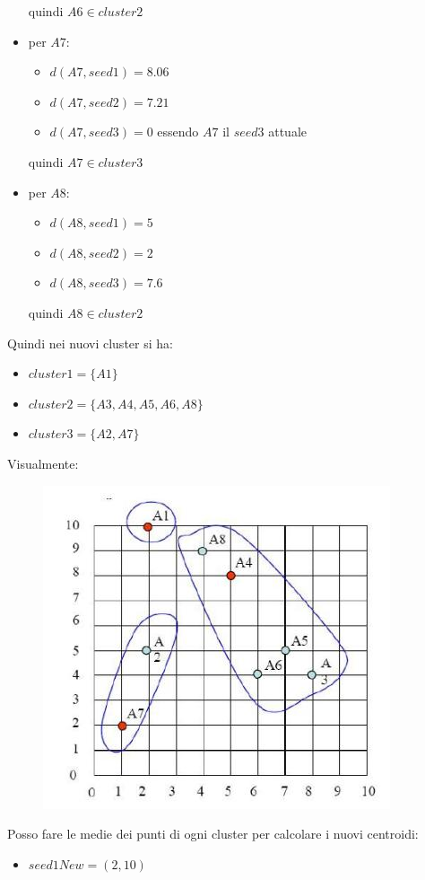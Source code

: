 \begin{esempio}
\begin{itemize}
    quindi $A6\in cluster2$
    \item per $A7$:
    \begin{itemize}
      \item $d(A7, seed1)=8.06$ 
      \item $d(A7, seed2)=7.21$ 
      \item $d(A7, seed3)=0$ essendo $A7$ il $seed3$ attuale
    \end{itemize}
    quindi $A7\in cluster3$
    \item per $A8$:
    \begin{itemize}
      \item $d(A8, seed1)=5$ 
      \item $d(A8, seed2)=2$
      \item $d(A8, seed3)=7.6$
    \end{itemize}
    quindi $A8\in cluster2$
  \end{itemize}
  Quindi nei nuovi cluster si ha:
  \begin{itemize}
    \item $cluster1=\{A1\}$
    \item $cluster2=\{A3, A4, A5, A6, A8\}$
    \item $cluster3=\{A2, A7\}$
  \end{itemize}
  Visualmente:
  \begin{figure}[H]
    \centering
    \includegraphics[scale = 0.4]{img/clue2.jpg}
  \end{figure}
  Posso fare le medie dei punti di ogni cluster per calcolare i nuovi
  centroidi: 
  \begin{itemize}
    \item $seed1New=(2, 10)$

\end{itemize}
\end{esempio}
